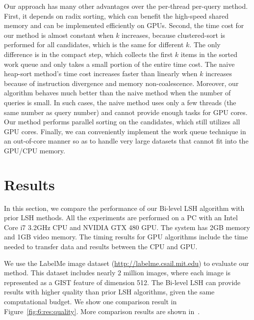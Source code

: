 Our approach has many other advantages over the per-thread per-query method. First, it depends on radix sorting, which can benefit the high-speed shared memory and can be implemented efficiently on GPUs.
Second, the time cost for our method is almost constant when $k$ increases, because clustered-sort is performed for all candidates, which is the same for different $k$. The only difference is in the compact step, which collects the first $k$ items in the sorted work queue and only takes a small portion of the entire time cost. The naive heap-sort method's time cost increases faster than linearly when $k$ increases because of instruction divergence and memory non-coalescence. Moreover, our algorithm behaves much better than the naive method when the number of queries is small. In such cases, the naive method uses only a few threads (the same number as query number) and cannot provide enough tasks for GPU cores. Our method performs parallel sorting on the candidates, which still utilizes all GPU cores. Finally, we can conveniently implement the work queue technique in an out-of-core manner so as to handle very large datasets that cannot fit into the GPU/CPU memory.


\section{Results}
\label{sec:6:res}
In this section, we compare the performance of our Bi-level LSH algorithm with prior LSH methods. All the experiments are performed on a PC with an Intel Core i7 3.2GHz CPU and NVIDIA GTX 480 GPU. The system has 2GB memory and 1GB video memory. The timing results for GPU algorithms include the time needed to transfer data and results between the CPU and GPU.

We use the LabelMe image dataset ({\small \url{http://labelme.csail.mit.edu}}) to evaluate our method. This dataset includes nearly 2 million images, where each image is represented as a GIST feature of dimension 512. The Bi-level LSH can provide results with higher quality than prior LSH algorithms, given the same computational budget. We show one comparison result in Figure~\ref{fig:6:res:quality}. More comparison results are shown in~\cite{BilevelLSH2011}.

